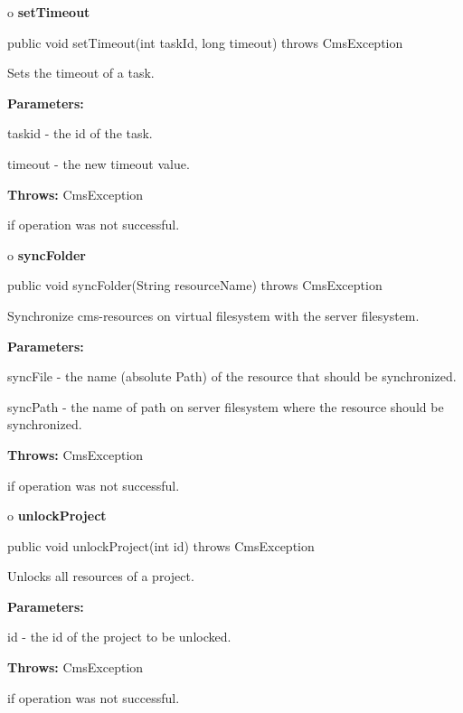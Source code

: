 o {\bf setTimeout} 

\begin{PRE}
 public void setTimeout(int taskId,
                        long timeout) throws CmsException
\end{PRE}

\begin{description}
\htmlDD Sets the timeout of a task. 

\begin{description}
\item {\bf Parameters:}  

taskid - the id of the task.  

timeout - the new timeout value.  
\item {\bf Throws:} CmsException  

if operation was not successful.  
\end{description}

\end{description}

o {\bf syncFolder} 

\begin{PRE}
 public void syncFolder(String resourceName) throws CmsException
\end{PRE}

\begin{description}
\htmlDD Synchronize cms-resources on virtual filesystem with the server
filesystem. 

\begin{description}
\item {\bf Parameters:}  

syncFile - the name (absolute Path) of the resource that should be
synchronized.  

syncPath - the name of path on server filesystem where the resource should be
synchronized.  
\item {\bf Throws:} CmsException  

if operation was not successful.  
\end{description}

\end{description}

o {\bf unlockProject} 

\begin{PRE}
 public void unlockProject(int id) throws CmsException
\end{PRE}

\begin{description}
\htmlDD Unlocks all resources of a project. 

\begin{description}
\item {\bf Parameters:}  

id - the id of the project to be unlocked.  
\item {\bf Throws:} CmsException  

if operation was not successful.  
\end{description}

\end{description}

